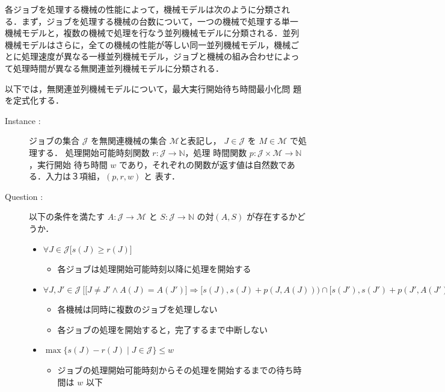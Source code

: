 \documentclass[12pt]{optlab-bachelor}
\begin{document}
各ジョブを処理する機械の性能によって，機械モデルは次のように分類され
る．まず，ジョブを処理する機械の台数について，一つの機械で処理する単一
機械モデルと，複数の機械で処理を行なう並列機械モデルに分類される．並列
機械モデルはさらに，全ての機械の性能が等しい同一並列機械モデル，機械ご
とに処理速度が異なる一様並列機械モデル，ジョブと機械の組み合わせによっ
て処理時間が異なる無関連並列機械モデルに分類される．

以下では，無関連並列機械モデルについて，最大実行開始待ち時間最小化問
題を定式化する．

\begin{description}
  \item[Instance : ] ジョブの集合 $\mathcal{J}$ を無関連機械の集合 $\mathcal{M}$と表記し，
  $J \in \mathcal{J}$ を $M \in \mathcal{M}$ で処理する．
  処理開始可能時刻関数 $r : \mathcal{J} \to \mathbb{N}$，処理
  時間関数 $p : \mathcal{J} \times \mathcal{M} \to \mathbb{N}$，実行開始
  待ち時間 $w$ であり，それぞれの関数が返す値は自然数である．入力は３項組，$(p,r,w)$ と
  表す．
  \item[Question : ] 以下の条件を満たす $A : \mathcal{J} \to \mathcal{M}$ と $S : \mathcal{J} \to
  \mathbb{N}$ の対$(A,S)$ が存在するかどうか．
  \begin{itemize}
    \item $\forall J \in \mathcal{J}\big[s(J) \ge r(J) \big]$
    \begin{itemize}
      \item 各ジョブは処理開始可能時刻以降に処理を開始する
    \end{itemize}
    \item $\forall J, J' \in \mathcal{J}\ \Big[ \big[J\ne J' \land A(J) = A(J')\big] \Rightarrow [s(J), s(J)+p(J,A(J))) \cap[s(J'), s(J')+p(J', A(J'))) = \emptyset \Big]$
    \begin{itemize}
      \item 各機械は同時に複数のジョブを処理しない
      \item 各ジョブの処理を開始すると，完了するまで中断しない
    \end{itemize}
    \item $\max\big\{s(J) - r(J) \mid J \in \mathcal{J}\big\} \le w$
    \begin{itemize}
      \item ジョブの処理開始可能時刻からその処理を開始するまでの待ち時間は $w$ 以下
    \end{itemize}
  \end{itemize}
\end{description}
\end{document}
